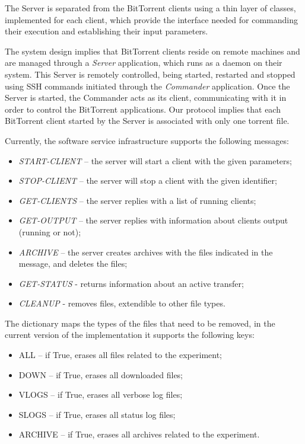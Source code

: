 The Server is separated from the BitTorrent clients using a thin layer of
classes, implemented for each client, which provide the interface needed for
commanding their execution and establishing their input parameters.

The system design implies that BitTorrent clients reside on remote machines
and are managed through a \textit{Server} application, which runs as a daemon
on their system. This Server is remotely controlled, being started, restarted
and stopped using SSH commands initiated through the \textit{Commander}
application. Once the Server is started, the Commander acts as its client,
communicating with it in order to control the BitTorrent applications. Our
protocol implies that each BitTorrent client started by the Server is
associated with only one torrent file.

Currently, the software service infrastructure supports the following messages:
\begin{itemize}
  \item \textit{START-CLIENT} -- the server will start a client with the given
  parameters;
  \item \textit{STOP-CLIENT} -- the server will stop a client with the given
  identifier;
  \item \textit{GET-CLIENTS} -- the server replies with a list of running
  clients;
  \item \textit{GET-OUTPUT} -- the server replies with information about
  clients output (running or not);
  \item \textit{ARCHIVE } -- the server creates archives with the files
  indicated in the message, and deletes the files;
  \item \textit{GET-STATUS} - returns information about an active transfer;
  \item \textit{CLEANUP} - removes files, extendible to other file types.
\end{itemize}

The dictionary maps the types of the files that need to be removed, in the
current version of the implementation it supports the following keys:

\begin{itemize}
  \item ALL -- if True, erases all files related to the experiment;
  \item DOWN -- if True, erases all downloaded files;
  \item VLOGS -- if True, erases all verbose log files;
  \item SLOGS -- if True, erases all status log files;
  \item ARCHIVE -- if True, erases all archives related to the experiment.
\end{itemize}

